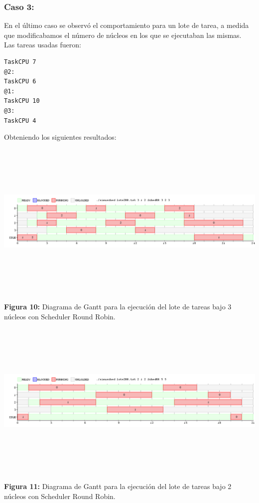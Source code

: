 \documentclass[a4paper]{article}
\begin{document}
 
 \subsubsection{Caso 3:}
 
 En el último caso se observó el comportamiento para un lote  de tarea, a medida que modificabamos el número de núcleos en los que se ejecutaban las mismas.\\
 
 Las tareas usadas fueron:
 \begin{codesnippet}
	\begin{verbatim}
TaskCPU 7
@2:
TaskCPU 6
@1:
TaskCPU 10
@3:
TaskCPU 4
	\end{verbatim}
	\end{codesnippet}
	\newpage
	
	Obteniendo los siguientes resultados:

  \includegraphics[width=\textwidth,height=3.0in,keepaspectratio]{imagenes/ej4/eje4.png} \\
\begin {flushleft}
\textbf{Figura 10:} Diagrama de Gantt para la ejecuci\'on del lote de tareas bajo 3 n\'ucleos con Scheduler Round Robin.
\end{flushleft}

 \includegraphics[width=\textwidth,height=3.0in,keepaspectratio]{imagenes/ej4/eje6.png} \\
\begin {flushleft}
\textbf{Figura 11:} Diagrama de Gantt para la ejecuci\'on del lote de tareas bajo 2 n\'ucleos con Scheduler Round Robin.
\end{flushleft}
 
\end{document}
